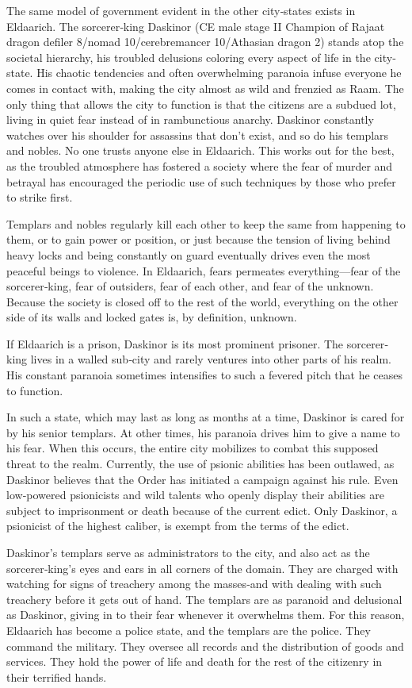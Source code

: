 {
	The same model of government evident in the other city‐states exists in Eldaarich. The sorcerer‐king Daskinor (CE male stage II Champion of Rajaat dragon defiler 8/nomad 10/cerebremancer 10/Athasian dragon 2) stands atop the societal hierarchy, his troubled delusions coloring every aspect of life in the city‐state. His chaotic tendencies and often overwhelming paranoia infuse everyone he comes in contact with, making the city almost as wild and frenzied as Raam. The only thing that allows the city to function is that the citizens are a subdued lot, living in quiet fear instead of in rambunctious anarchy. Daskinor constantly watches over his shoulder for assassins that don't exist, and so do his templars and nobles. No one trusts anyone else in Eldaarich. This works out for the best, as the troubled atmosphere has fostered a society where the fear of murder and betrayal has encouraged the periodic use of such techniques by those who prefer to strike first.

	Templars and nobles regularly kill each other to keep the same from happening to them, or to gain power or position, or just because the tension of living behind heavy locks and being constantly on guard eventually drives even the most peaceful beings to violence. In Eldaarich, fears permeates everything---fear of the sorcerer‐king, fear of outsiders, fear of each other, and fear of the unknown. Because the society is closed off to the rest of the world, everything on the other side of its walls and locked gates is, by definition, unknown.

	If Eldaarich is a prison, Daskinor is its most prominent prisoner. The sorcerer‐king lives in a walled sub‐city and rarely ventures into other parts of his realm. His constant paranoia sometimes intensifies to such a fevered pitch that he ceases to function.

	In such a state, which may last as long as months at a time, Daskinor is cared for by his senior templars. At other times, his paranoia drives him to give a name to his fear. When this occurs, the entire city mobilizes to combat this supposed threat to the realm. Currently, the use of psionic abilities has been outlawed, as Daskinor believes that the Order has initiated a campaign against his rule. Even low‐powered psionicists and wild talents who openly display their abilities are subject to imprisonment or death because of the current edict. Only Daskinor, a psionicist of the highest caliber, is exempt from the terms of the edict.

	Daskinor's templars serve as administrators to the city, and also act as the sorcerer‐king's eyes and ears in all corners of the domain. They are charged with watching for signs of treachery among the masses‐and with dealing with such treachery before it gets out of hand. The templars are as paranoid and delusional as Daskinor, giving in to their fear whenever it overwhelms them. For this reason, Eldaarich has become a police state, and the templars are the police. They command the military. They oversee all records and the distribution of goods and services. They hold the power of life and death for the rest of the citizenry in their terrified hands.
}
